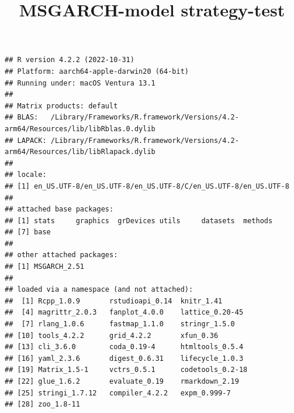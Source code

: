 \documentclass[
]{article}
\title{MSGARCH-model strategy-test}
\author{}
\date{\vspace{-2.5em}}
\newenvironment{Shaded}{\begin{snugshade}}{\end{snugshade}}
\newcommand{\AttributeTok}[1]{\textcolor[rgb]{0.77,0.63,0.00}{#1}}
\newcommand{\CommentTok}[1]{\textcolor[rgb]{0.56,0.35,0.01}{\textit{#1}}}
\newcommand{\ConstantTok}[1]{\textcolor[rgb]{0.00,0.00,0.00}{#1}}
\newcommand{\DecValTok}[1]{\textcolor[rgb]{0.00,0.00,0.81}{#1}}
\newcommand{\FunctionTok}[1]{\textcolor[rgb]{0.00,0.00,0.00}{#1}}
\newcommand{\NormalTok}[1]{#1}
\newcommand{\OtherTok}[1]{\textcolor[rgb]{0.56,0.35,0.01}{#1}}
\newcommand{\SpecialCharTok}[1]{\textcolor[rgb]{0.00,0.00,0.00}{#1}}
\newcommand{\StringTok}[1]{\textcolor[rgb]{0.31,0.60,0.02}{#1}}
\begin{document}
\maketitle

{
\setcounter{tocdepth}{2}
\tableofcontents
}
\begin{Shaded}
\end{Shaded}

\begin{verbatim}
## R version 4.2.2 (2022-10-31)
## Platform: aarch64-apple-darwin20 (64-bit)
## Running under: macOS Ventura 13.1
## 
## Matrix products: default
## BLAS:   /Library/Frameworks/R.framework/Versions/4.2-arm64/Resources/lib/libRblas.0.dylib
## LAPACK: /Library/Frameworks/R.framework/Versions/4.2-arm64/Resources/lib/libRlapack.dylib
## 
## locale:
## [1] en_US.UTF-8/en_US.UTF-8/en_US.UTF-8/C/en_US.UTF-8/en_US.UTF-8
## 
## attached base packages:
## [1] stats     graphics  grDevices utils     datasets  methods  
## [7] base     
## 
## other attached packages:
## [1] MSGARCH_2.51
## 
## loaded via a namespace (and not attached):
##  [1] Rcpp_1.0.9       rstudioapi_0.14  knitr_1.41      
##  [4] magrittr_2.0.3   fanplot_4.0.0    lattice_0.20-45 
##  [7] rlang_1.0.6      fastmap_1.1.0    stringr_1.5.0   
## [10] tools_4.2.2      grid_4.2.2       xfun_0.36       
## [13] cli_3.6.0        coda_0.19-4      htmltools_0.5.4 
## [16] yaml_2.3.6       digest_0.6.31    lifecycle_1.0.3 
## [19] Matrix_1.5-1     vctrs_0.5.1      codetools_0.2-18
## [22] glue_1.6.2       evaluate_0.19    rmarkdown_2.19  
## [25] stringi_1.7.12   compiler_4.2.2   expm_0.999-7    
## [28] zoo_1.8-11
\end{verbatim}
\end{document}
